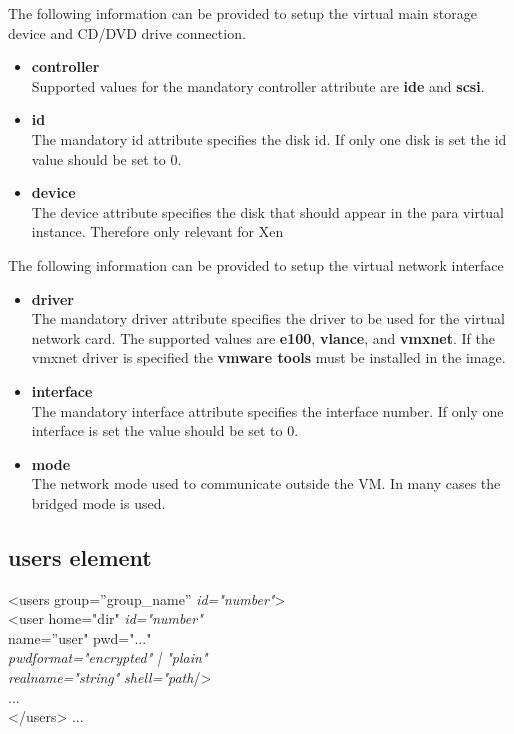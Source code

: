 \begin{itemize}
	The following information can be provided to setup the virtual
	main storage device and CD/DVD drive connection.

	\begin{itemize}
	\item \textbf{controller}\\
      Supported values for the mandatory controller attribute are \textbf{ide}
      and \textbf{scsi}.
	\item \textbf{id}\\
      The mandatory id attribute specifies the disk id. If only one
      disk is set the id value should be set to 0.
	\item \textbf{device}\\
      The device attribute specifies the disk that should appear
      in the para virtual instance. Therefore only relevant for Xen
	\end{itemize}

	The following information can be provided to setup the virtual
	network interface

	\begin{itemize}
	\item \textbf{driver}\\
      The mandatory driver attribute specifies the driver to be used for
      the virtual network card. The supported values are \textbf{e100},
      \textbf{vlance}, and \textbf{vmxnet}. If the vmxnet driver is
      specified the \textbf{vmware tools} must be installed in the image.
	\item \textbf{interface}\\
      The mandatory interface attribute specifies the interface number. If
      only one interface is set the value should be set to 0.
	\item \textbf{mode}\\
      The network mode used to communicate outside the VM. In many cases
      the bridged mode is used.
	\end{itemize}
\end{itemize}

\subsection{users element}
\begin{Command}{12cm}
<users group=''group\_name'' \textit{id="number"}>\\
\hspace*{1cm}<user home="dir" \textit{id="number"}\\ 
\hspace*{1.5cm}name=''user" pwd="..."\\
\hspace*{1.5cm}\textit{pwdformat="encrypted" | "plain"}\\
\hspace*{1.5cm}\textit{realname="string"} \textit{shell="path}/>\\
\hspace*{1cm}...\\
</users>
...
\end{Command}

